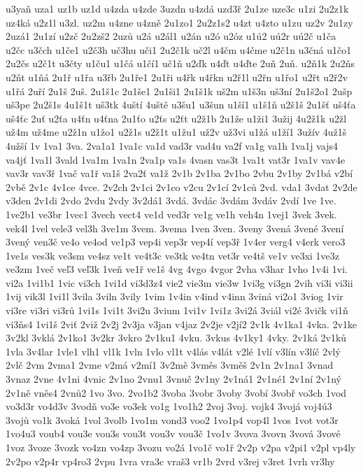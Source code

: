 {u3yaň
uza1
uz1b
uz1d
u4zda
u4zde
3uzdn
u4zdá
uzd3ř
2u1ze
uze3c
u1zi
2u2z1k
uz4ká
u2z1l
u3zl.
uz2m
u4zne
u4zně
2u1zo1
2u2z1s2
u4zt
u4zto
u1zu
uz2v
2u1zy
2uzá1
2u1zí
u2zč
2u2zš2
2uzů
u2á
u2ál1
u2án
u2ó
u2óz
u1ú2
uú2r
uú2č
u1ča
u2čc
u3čch
u1če1
u2č3h
uč3hu
uči1
2u2č1k
uč2l
u4čm
u4čme
u2č1n
u3čná
u1čo1
2u2čs
u2č1t
u3čty
u1ču1
u1čá
u1čí1
uč1ň
u2ďk
u4ďt
u4ďte
2uň
2uň.
u2ň1k
2u2ňs
u2ňt
u1ňá
2u1ř
u1řa
u3řb
2u1ře1
2u1ři
u4řk
u4řkn
u2ř1l
u2řn
u1řo1
u2řt
u2ř2v
u1řá
2uří
2u1š
2uš.
2u1š1c
2u1še1
2u1ši1
2u1š1k
uš2m
u1š3n
uš3ní
2u1š2o1
2ušp
uš3pe
2u2š1s
4u1š1t
uš3tk
4uští
4uště
u3šu1
u3šun
u1ší1
u1š1ň
u2š1š
2u1šť
uš4ťa
uš4ťc
2uť
u2ťa
u4ťn
u4ťna
2u1ťo
u2ťs
u2ťt
u2ž1b
2u1že
u1ži1
3užij
4u2ž1k
u2žl
už4m
už4me
u2ž1n
u1žo1
u2ž1s
u2ž1t
u1žu1
už2v
už3vi
u1žá
u1ží1
3užív
4už1š
4užší
1v
1va1
3va.
2va1a1
1va1c
va1d
vad3r
vad4u
va2f
va1g
va1h
1va1j
vajs4
va4jť
1va1l
3vald
1va1m
1va1n
2va1p
va1s
4vasn
vas3t
1va1t
vat3r
1va1v
vav4e
vav3r
vav3ř
1vač
va1ř
va1š
2va2ť
va1ž
2v1b
2v1ba
2v1bo
2vbu
2v1by
2v1bá
v2bí
2vbě
2v1c
4v1ce
4vce.
2v2ch
2v1ci
2v1co
v2cu
2v1cí
2v1ců
2vd.
vda1
3vdat
2v2de
v3den
2v1di
2vdo
2vdu
2vdy
3v2dá1
3vdá.
3vdác
3vdám
3vdáv
2vdí
1ve
1ve.
1ve2b1
ve3br
1vec1
3vech
vect4
ve1d
ved3r
ve1g
ve1h
veh4n
1vej1
3vek
3vek.
vek4l
1vel
vele3
vel3h
3ve1m
3vem.
3vema
1ven
3ven.
3veny
3vená
3vené
3vení
3vený
ven3č
ve4o
ve4od
ve1p3
vep4i
vep3r
vep4í
vep3ř
1v4er
verg4
v4erk
vero3
1ve1s
ves3k
ve3sm
ve4sz
ve1t
ve4t3c
ve3tk
ve4tn
vet3r
ve4tš
ve1v
ve3xi
1ve3z
ve3zm
1več
veľ3
veľ3k
1veň
ve1ř
ve1š
4vg
4vgo
4vgor
2vha
v3har
1vho
1v4i
1vi.
vi2a
1vi1b1
1vic
vi3ch
1vi1d
vi3d3z4
vie2
vie3m
vie3w
1vi3g
vi3gn
2vih
vi3i
vi3ii
1vij
vik3l
1vi1l
3vila
3viln
3vily
1vim
1v4in
v4ind
v4inn
3viná
vi2o1
3viog
1vir
vi3re
vi3ri
vi3rů
1vi1s
1vi1t
3vi2u
3vium
1vi1v
1vi1z
3vi2á
3viál
vi2é
3vičk
vi1ň
vi3ňs4
1vi1š
2viť
2viž
2v2j
2v3ja
v3jan
v4jaz
2v2je
v2jí2
2v1k
4v1ka1
4vka.
2v1ke
3v2kl
3vklá
2v1ko1
3v2kr
3vkro
2v1ku1
4vku.
3vkus
4v1ky1
4vky.
2v1ká
2v1ků
1vla
3v4lar
1vle1
vlh1
vl1k
1vln
1vlo
vl1t
v4lás
v4lát
v2lé
1vlí
v3lín
v3líč
2vlý
2vlč
2vm
2vma1
2vme
v2má
v2mí1
3v2mě
3vměs
3vměš
2v1n
2v1na1
3vnad
3vnaz
2vne
4v1ni
4vnic
2v1no
2vnu1
3vnuč
2v1ny
2v1ná1
2v1né1
2v1ní
2v1ný
2v1ně
vněs4
2vnů2
1vo
3vo.
2vo1b2
3voba
3vobr
3voby
3vobí
3vobř
vo3ch
1vod
vo3d3r
vo4d3v
3vodň
vo3e
vo3ek
vo1g
1vo1h2
2voj
3voj.
vojk4
3vojá
voj4ú3
3vojů
vo1k
3voká
1vol
3volb
1vo1m
vond3
voo2
1vo1p4
vop4l
1vos
1vot
vot3r
1vo4u3
voub4
vou3e
vou3s
vou3t
vou3v
vou3č
1vo1v
3vova
3vovn
3vová
3vové
1voz
3voze
3vozk
vo4zn
vo4zp
3vozu
vo2á
1vo1č
vo1ř
2v2p
v2pa
v2pi1
v2pl
vp4ly
2v2po
v2p4r
vp4ro3
2vpu
1vra
vra3c
vraš3
vr1b
2vrd
v3rej
v3ret
1vrh
vr3hy
}

